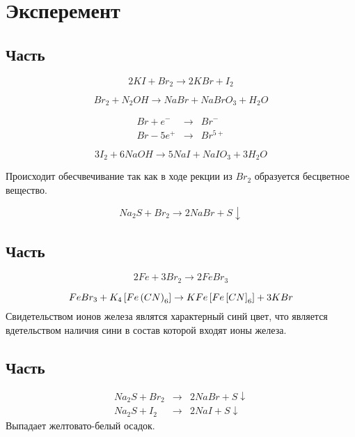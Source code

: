 \section{Эксперемент}
\subsection{Часть}
\begin{equation}
    2KI + Br_2 \to 2KBr + I_2
\end{equation}


\begin{equation}
    Br_2 + N_2OH \to NaBr + NaBrO_3 + H_2O
\end{equation}

\begin{eqnarray}
    Br + e^- &\to& Br^- \\
    Br - 5e^+ &\to& Br^{5+}
\end{eqnarray}

\begin{equation}
    3I_2 + 6NaOH \to 5NaI + NaI O_3 + 3H_2O
\end{equation}


Происходит обесчвечивание так как в ходе рекции из $Br_2$ образуется 
бесцветное вещество.

\begin{equation}
    Na_2S + Br_2 \to 2NaBr + S\downarrow
\end{equation}

\subsection{Часть}
\begin{equation}
    2Fe + 3Br_2 \to 2FeBr_3
\end{equation}

\begin{equation}
    FeBr_3 + K_4\left[ Fe\left( CN \right)_6 \right] \to 
    KFe\left[ Fe\left[ CN \right]_6 \right] + 3KBr
\end{equation}
Свидетельством ионов железа являтся характерный синй цвет, что 
является вдетельством наличия сини в состав которой входят ионы железа.
\subsection{Часть}
\begin{eqnarray}
    Na_2S + Br_2 &\to& 2NaBr + S\downarrow \\
    Na_2S + I_2 &\to& 2NaI + S\downarrow
\end{eqnarray}
Выпадает желтовато-белый осадок.



